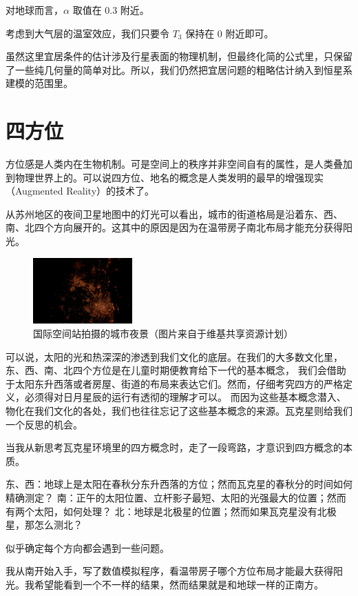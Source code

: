 \documentclass[a4paper,10.5pt]{book}
\begin{document}
对地球而言，$\alpha$ 取值在 0.3 附近。

考虑到大气层的温室效应，我们只要令 $T_3$ 保持在 0 附近即可。

虽然这里宜居条件的估计涉及行星表面的物理机制，但最终化简的公式里，只保留了一些纯几何量的简单对比。所以，我们仍然把宜居问题的粗略估计纳入到恒星系建模的范围里。

\section{四方位}

方位感是人类内在生物机制。可是空间上的秩序并非空间自有的属性，是人类叠加到物理世界上的。可以说四方位、地名的概念是人类发明的最早的增强现实（Augmented Reality）的技术了。

从苏州地区的夜间卫星地图中的灯光可以看出，城市的街道格局是沿着东、西、南、北四个方向展开的。这其中的原因是因为在温带房子南北布局才能充分获得阳光。

\begin{figure}[ht]
\centering
\includegraphics[width=1.5in]{images/4_01-ISS-30_Nighttime_view_of_Shanghai.jpg}
\caption{国际空间站拍摄的城市夜景（图片来自于维基共享资源计划）}
\end{figure}

可以说，太阳的光和热深深的渗透到我们文化的底层。在我们的大多数文化里，东、西、南、北四个方位是在儿童时期便教育给下一代的基本概念，
我们会借助于太阳东升西落或者房屋、街道的布局来表达它们。然而，仔细考究四方的严格定义，必须得对日月星辰的运行有透彻的理解才可以。
而因为这些基本概念潜入、物化在我们文化的各处，我们也往往忘记了这些基本概念的来源。瓦克星则给我们一个反思的机会。

当我从新思考瓦克星环境里的四方概念时，走了一段弯路，才意识到四方概念的本质。

东、西：地球上是太阳在春秋分东升西落的方位；然而瓦克星的春秋分的时间如何精确测定？
南：正午的太阳位置、立杆影子最短、太阳的光强最大的位置；然而有两个太阳，如何处理？
北：地球是北极星的位置；然而如果瓦克星没有北极星，那怎么测北？

似乎确定每个方向都会遇到一些问题。

我从南开始入手，写了数值模拟程序，看温带房子哪个方位布局才能最大获得阳光。我希望能看到一个不一样的结果，然而结果就是和地球一样的正南方。
\end{document}
